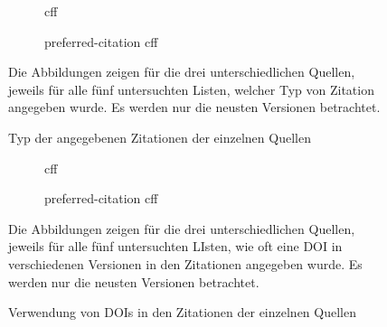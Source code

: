 \begin{figure}
    \begin{subfigure}{.5\textwidth}
        \centering
        
        \caption{\gls{cff}}
        \label{fig:citation_counts_cff}
    \end{subfigure}%
    \begin{subfigure}{.5\textwidth}
        \centering
        
        \caption{\glqq preferred-citation\grqq{} \gls{cff}}
        \label{fig:citation_counts_preferred_citation_cff}
    \end{subfigure}
    \centering
    \begin{subfigure}{.5\textwidth}
        \centering
        
        \caption{}
        \label{fig:citation_counts_bib}
    \end{subfigure}
    \caption{Typ der angegebenen Zitationen der einzelnen Quellen}
    \small
    Die Abbildungen zeigen für die drei unterschiedlichen Quellen, jeweils für alle fünf untersuchten Listen, welcher Typ von Zitation angegeben wurde. Es werden nur die neusten Versionen betrachtet.
\end{figure}

\begin{figure}
    \begin{subfigure}{.5\textwidth}
        \centering
        
        \caption{\gls{cff}}
        \label{fig:cff_doi}
    \end{subfigure}%
    \begin{subfigure}{.5\textwidth}
        \centering
        
        \caption{\glqq preferred-citation\grqq{} \gls{cff}}
        \label{fig:preferred_citation_doi}
    \end{subfigure}
    \centering
    \begin{subfigure}{.5\textwidth}
        \centering
        
        \caption{}
        \label{fig:bib_doi}
    \end{subfigure}
    \caption{Verwendung von DOIs in den Zitationen der einzelnen Quellen}
    \small
    Die Abbildungen zeigen für die drei unterschiedlichen Quellen, jeweils für alle fünf untersuchten LIsten, wie oft eine DOI in verschiedenen Versionen in den Zitationen angegeben wurde. Es werden nur die neusten Versionen betrachtet.
\end{figure}

